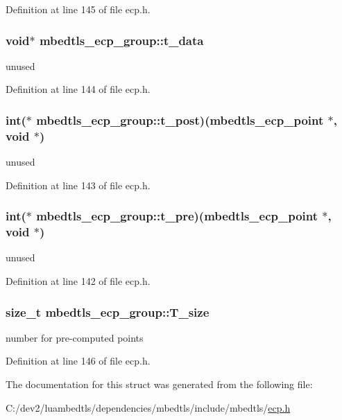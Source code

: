 Definition at line 145 of file ecp.\-h.

\hypertarget{structmbedtls__ecp__group_a7400fa2acba24d9b8a7a107d9fcde36f}{
\subsubsection[{t\-\_\-data}]{\setlength{\rightskip}{0pt plus 5cm}void$\ast$ mbedtls\-\_\-ecp\-\_\-group\-::t\-\_\-data}}\label{structmbedtls__ecp__group_a7400fa2acba24d9b8a7a107d9fcde36f}
unused 

Definition at line 144 of file ecp.\-h.

\hypertarget{structmbedtls__ecp__group_a21a27617d962734b66bcc567fbeeab99}{
\subsubsection[{t\-\_\-post}]{\setlength{\rightskip}{0pt plus 5cm}int($\ast$ mbedtls\-\_\-ecp\-\_\-group\-::t\-\_\-post)({\bf mbedtls\-\_\-ecp\-\_\-point} $\ast$, void $\ast$)}}\label{structmbedtls__ecp__group_a21a27617d962734b66bcc567fbeeab99}
unused 

Definition at line 143 of file ecp.\-h.

\hypertarget{structmbedtls__ecp__group_a14933889cd68b78fdb8b92956623b6dc}{
\subsubsection[{t\-\_\-pre}]{\setlength{\rightskip}{0pt plus 5cm}int($\ast$ mbedtls\-\_\-ecp\-\_\-group\-::t\-\_\-pre)({\bf mbedtls\-\_\-ecp\-\_\-point} $\ast$, void $\ast$)}}\label{structmbedtls__ecp__group_a14933889cd68b78fdb8b92956623b6dc}
unused 

Definition at line 142 of file ecp.\-h.

\hypertarget{structmbedtls__ecp__group_a4b9a1bf79d2023dbc3807dc7e12059af}{
\subsubsection[{T\-\_\-size}]{\setlength{\rightskip}{0pt plus 5cm}size\-\_\-t mbedtls\-\_\-ecp\-\_\-group\-::\-T\-\_\-size}}\label{structmbedtls__ecp__group_a4b9a1bf79d2023dbc3807dc7e12059af}
number for pre-\/computed points 

Definition at line 146 of file ecp.\-h.



The documentation for this struct was generated from the following file\-:\begin{DoxyCompactItemize}
\item 
C\-:/dev2/luambedtls/dependencies/mbedtls/include/mbedtls/\hyperlink{ecp_8h}{ecp.\-h}\end{DoxyCompactItemize}
